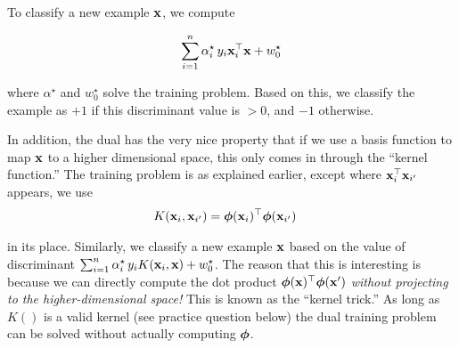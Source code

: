\documentclass[11pt,letterpaper]{article}
\begin{document}
\noindent To classify a new example $\mathbf{x}$, we compute 

$$\sum_{i=1}^n\alpha^\star_i \,y_i \mathbf{x}_i^\top \mathbf{x}+w_0^\star$$

\noindent where $\alpha^\star$ and $w_0^\star$ solve
the training problem. Based on this, we classify the example
as $+1$ if this discriminant value is $>0$, and $-1$ otherwise. 

\noindent In addition, the dual has the very nice property that 
if we use a basis function to map $\mathbf{x}$ to a higher dimensional space, 
this only comes in through the ``kernel function.''
The training problem is as explained earlier, except where
$\mathbf{x}_i^\top \mathbf{x}_{i'}$ appears, we use 
%
\begin{align*}
K(\mathbf{x}_i,\mathbf{x}_{i'})&=\boldsymbol{\phi}(\mathbf{x}_i)^\top\boldsymbol{\phi}(\mathbf{x}_{i'})
\end{align*}

\noindent in its place. Similarly, we classify  a new example $\mathbf{x}$
based on the value of discriminant 
$\sum_{i=1}^n\alpha^\star_i \,y_i K(\mathbf{x}_i,\mathbf{x})
+w_0^\star$. The reason that this is interesting
is because we can directly compute the dot product
$\boldsymbol{\phi}(\mathbf{x})^\top \boldsymbol{\phi}(\mathbf{x}')$
{\em without projecting to the higher-dimensional space!}
This is known as the ``kernel trick.''
As long as $K()$ is a valid kernel (see practice question below)
the dual training problem can be solved without actually computing $\boldsymbol{\phi}$.

\newpage
\end{document}
